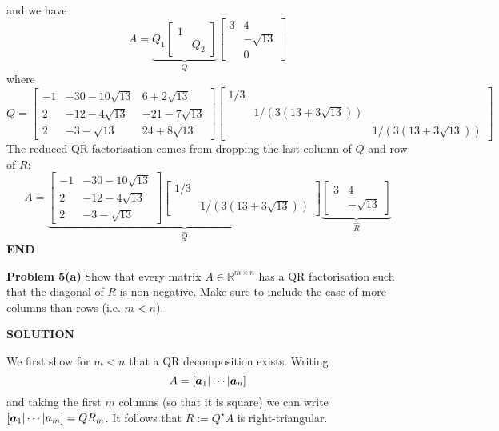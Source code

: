 \documentclass[12pt,a4paper]{article}
\def\bbR{ {\mathbb R} }
\def\a{ {\vc a} }
\begin{document}
and we have
\[
A = \underbrace{Q_1 \begin{bmatrix} 1 \\ & Q_2 \end{bmatrix}}_Q \begin{bmatrix}3 & 4 \\ & -\sqrt{13} \\ & 0 
\end{bmatrix}
\]
where
\[
Q = \begin{bmatrix} -1 & -30-10\sqrt{13} & 6+2\sqrt{13} \\
            2 & -12-4\sqrt{13} & -21-7\sqrt{13} \\
            2 & -3-\sqrt{13} & 24+8\sqrt{13} \end{bmatrix} \begin{bmatrix} 1/3 \\ & 1/(3(13+3\sqrt{13})) \\ && 1/(3(13+3\sqrt{13})) \end{bmatrix}
\]
The reduced QR factorisation comes from dropping the last column of $Q$ and row of $R$:
\[
A = \underbrace{\begin{bmatrix} -1 & -30-10\sqrt{13}  \\
            2 & -12-4\sqrt{13}  \\
            2 & -3-\sqrt{13}  \end{bmatrix} \begin{bmatrix} 1/3 \\ & 1/(3(13+3\sqrt{13})) \end{bmatrix}}_{\hat{Q}} 
            \underbrace{\begin{bmatrix}3 & 4 \\ & -\sqrt{13} 
\end{bmatrix}}_{\hat{R}}
\]
\textbf{END}

\textbf{Problem 5(a)} Show that every matrix $A \ensuremath{\in} \ensuremath{\bbR}^{m \ensuremath{\times} n}$ has a  QR factorisation such that the diagonal of $R$ is non-negative. Make sure to include the case of more columns than rows (i.e. $m < n$). 

\textbf{SOLUTION}

We first show for $m < n$ that a QR decomposition exists. Writing
\[
A = [\ensuremath{\bm{\a}}_1 | \ensuremath{\cdots} | \ensuremath{\bm{\a}}_n]
\]
and taking the first $m$ columns (so that it is square) we can write $[\ensuremath{\bm{\a}}_1 | \ensuremath{\cdots} | \ensuremath{\bm{\a}}_m] = Q R_m$. It follows that $R := Q^\ensuremath{\star} A$ is right-triangular.
\end{document}
